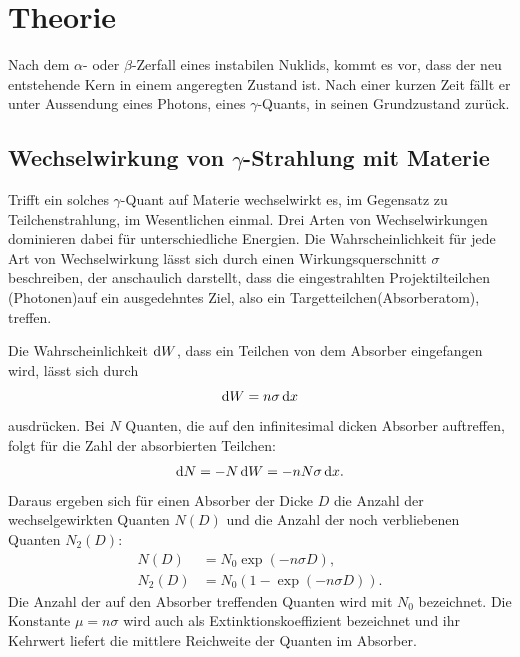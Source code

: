 \section{Theorie}
\label{sec:Theorie}

Nach dem $\alpha$- oder $\beta$-Zerfall eines instabilen Nuklids, kommt es vor, dass der neu entstehende Kern in einem angeregten Zustand ist. Nach einer kurzen Zeit fällt er unter Aussendung eines Photons, eines $\gamma$-Quants, in seinen Grundzustand zurück.

\subsection{Wechselwirkung von $\gamma$-Strahlung mit Materie}

Trifft ein solches $\gamma$-Quant auf Materie wechselwirkt es, im Gegensatz zu Teilchenstrahlung, im Wesentlichen einmal. Drei Arten von Wechselwirkungen dominieren dabei für unterschiedliche Energien. Die Wahrscheinlichkeit für jede Art von Wechselwirkung lässt sich durch einen Wirkungsquerschnitt $\sigma$ beschreiben, der anschaulich darstellt, dass die eingestrahlten Projektilteilchen (Photonen)auf ein ausgedehntes Ziel, also ein Targetteilchen(Absorberatom), treffen.

Die Wahrscheinlichkeit $\mathop{}\!\mathrm{d} W$, dass ein Teilchen von dem Absorber eingefangen wird, lässt sich durch
\begin{equation}
\mathop{}\!\mathrm{d} W = n \sigma \mathop{}\!\mathrm{d} x
\end{equation}
ausdrücken. Bei $N$ Quanten, die auf den infinitesimal dicken Absorber auftreffen, folgt für die Zahl der absorbierten Teilchen:
\begin{align*}
\mathop{}\!\mathrm{d} N = -N  \mathop{}\!\mathrm{d} W =-n N \sigma \mathop{}\!\mathrm{d} x\text{.}
\end{align*}
Daraus ergeben sich für einen Absorber der Dicke $D$ die Anzahl der wechselgewirkten Quanten $N(D)$ und die Anzahl der noch verbliebenen Quanten $N_2(D)$:
\begin{align}
N(D) 	&= N_0 \exp(-n \sigma D) \text{,}\\ 
N_2(D) 	&= N_0 (1 - \exp(-n \sigma D))\text{.}\label{eq:Nd}
\end{align}
Die Anzahl der auf den Absorber treffenden Quanten wird mit $N_0$ bezeichnet. Die Konstante $ \mu = n \sigma$ wird auch als Extinktionskoeffizient bezeichnet und ihr Kehrwert liefert die mittlere Reichweite der Quanten im Absorber.

